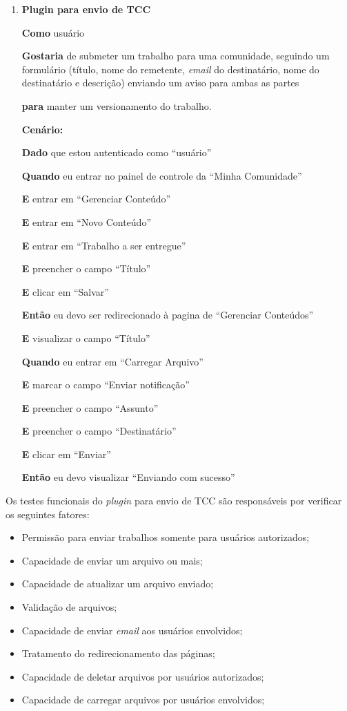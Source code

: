 \begin{enumerate}
\item  \textbf{Plugin para envio de TCC}

\textbf{Como} usuário

\textbf{Gostaria} de submeter um trabalho para uma comunidade, seguindo um formulário (título, nome do remetente, \textit{email} do destinatário, nome do destinatário e descrição) enviando um aviso para ambas as partes

\textbf{para} manter um versionamento do trabalho.


\textbf{Cenário:}

\textbf{Dado} que estou autenticado como ``usuário''

\textbf{Quando} eu entrar no painel de controle da ``Minha Comunidade''

\textbf{E} entrar em ``Gerenciar Conteúdo''

\textbf{E} entrar em ``Novo Conteúdo''

\textbf{E} entrar em ``Trabalho a ser entregue''

\textbf{E} preencher o campo ``Título''

\textbf{E} clicar em ``Salvar''

\textbf{Então} eu devo ser redirecionado à pagina de ``Gerenciar Conteúdos''

\textbf{E} visualizar o campo ``Título''

\textbf{Quando} eu entrar em ``Carregar Arquivo''

\textbf{E} marcar o campo ``Enviar notificação''

\textbf{E} preencher o campo ``Assunto''

\textbf{E} preencher o campo ``Destinatário''

\textbf{E} clicar em ``Enviar''

\textbf{Então} eu devo visualizar ``Enviando com sucesso''

\end{enumerate}

Os testes funcionais do \textit{plugin} para envio de TCC são responsáveis por verificar os seguintes fatores:

\begin{itemize}
\item Permissão para enviar trabalhos somente para usuários autorizados;
\item Capacidade de enviar um arquivo ou mais;
\item Capacidade de atualizar um arquivo enviado;
\item Validação de arquivos;
\item Capacidade de enviar \textit{email} aos usuários envolvidos;
\item Tratamento do redirecionamento das páginas;
\item Capacidade de deletar arquivos por usuários autorizados;
\item Capacidade de carregar arquivos por usuários envolvidos;
\end{itemize}

